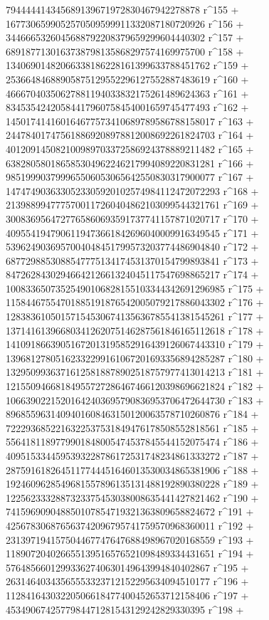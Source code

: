        794444414345689139671972830467942278878 r^155 + 
       1677306599052570509599911332087180720926 r^156 + 
       3446665326045688792208379659299604440302 r^157 + 
       6891877130163738798135868297574169975700 r^158 + 
       13406901482066338186228161399633788451762 r^159 + 
       25366484688905875129552296127552887483619 r^160 + 
       46667040350627881194033832175261489624363 r^161 + 
       83453542420584417960758454001659745477493 r^162 + 
       145017414160164677573410689789586788158017 r^163 + 
       244784017475618869208978812008692261824703 r^164 + 
       401209145082100989703372586924378889211482 r^165 + 
       638280580186585304962246217994089220831281 r^166 + 
       985199903799965506053065642550830317900077 r^167 + 
       1474749036330523305920102574984112472072293 r^168 + 
       2139889947775700117260404862103099544321761 r^169 + 
       3008369564727765860693591737741157871020717 r^170 + 
       4095541947906119473661842696040009916349545 r^171 + 
       5396249036957004048451799573203774486904840 r^172 + 
       6877298853088547775134174531370154799893841 r^173 + 
       8472628430294664212661324045117547698865217 r^174 + 
       10083365073525490106828155103344342691296985 r^175 + 
       11584467554701885191876542005079217886043302 r^176 + 
       12838361050157154530674135636785541381545261 r^177 + 
       13714161396680341262075146287561846165112618 r^178 + 
       14109186639051672013195852916439126067443310 r^179 + 
       13968127805162332299161067201693356894285287 r^180 + 
       13295099363716125818878902518757977413014213 r^181 + 
       12155094668184955727286467466120398696621824 r^182 + 
       10663902215201642403695790836953706472644730 r^183 + 
       8968559631409401608463150120063578710260876 r^184 + 
       7222936852216322537531849476178508552818561 r^185 + 
       5564181189779901848005474537845544152075474 r^186 + 
       4095153344595393228786172531748234861333272 r^187 + 
       2875916182645117744451646013530034865381906 r^188 + 
       1924609628549681557896135131488192890380228 r^189 + 
       1225623332887323375453038008635441427821462 r^190 + 
       741596909048850107854719321363809658824672 r^191 + 
       425678306876563742096795741759570968360011 r^192 + 
       231397194157504467747647688498967020168559 r^193 + 
       118907204026655139516576521098489334431651 r^194 + 
       57648566012993362740630149643994840402867 r^195 + 
       26314640343565553323712152295634094510177 r^196 + 
       11284164303220506618477400452653712158406 r^197 + 
       4534906742577984471281543129242829330395 r^198 + 
